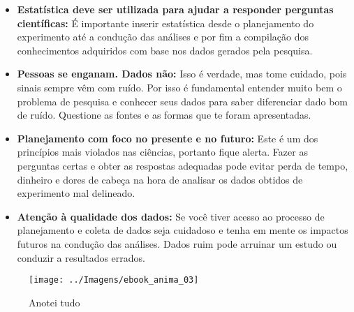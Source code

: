 \documentclass[12pt,]{style/krantz}
\theoremstyle{definition}
\theoremstyle{definition}
\theoremstyle{definition}
\theoremstyle{remark}
\begin{document}
\begin{itemize}
\item
  \textbf{Estatística deve ser utilizada para ajudar a responder perguntas científicas:} É importante inserir estatística desde o planejamento do experimento até a condução das análises e por fim a compilação dos conhecimentos adquiridos com base nos dados gerados pela pesquisa.
\item
  \textbf{Pessoas se enganam. Dados não:} Isso é verdade, mas tome cuidado, pois sinais sempre vêm com ruído. Por isso é fundamental entender muito bem o problema de pesquisa e conhecer seus dados para saber diferenciar dado bom de ruído. Questione as fontes e as formas que te foram apresentadas.
\item
  \textbf{Planejamento com foco no presente e no futuro:} Este é um dos princípios mais violados nas ciências, portanto fique alerta. Fazer as perguntas certas e obter as respostas adequadas pode evitar perda de tempo, dinheiro e dores de cabeça na hora de analisar os dados obtidos de experimento mal delineado.
\item
  \textbf{Atenção à qualidade dos dados:} Se você tiver acesso ao processo de planejamento e coleta de dados seja cuidadoso e tenha em mente os impactos futuros na condução das análises. Dados ruim pode arruinar um estudo ou conduzir a resultados errados.
\end{itemize}

\begin{figure}[H]

{\centering \texttt{[image: ../Imagens/ebook\_anima\_03]} 

}

\caption{Anotei tudo}\label{fig:fig03}
\end{figure}
\end{document}

